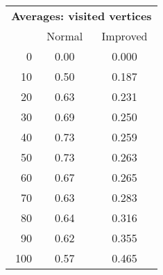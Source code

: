 \begin{tabular}{r|cc}
      \multicolumn{3}{c}{{\bf Averages: visited vertices }} \\
      & Normal & Improved \\ \hline\hline
0
& 0.00
& 0.000
\\
10
& 0.50
& 0.187
\\
20
& 0.63
& 0.231
\\
30
& 0.69
& 0.250
\\
40
& 0.73
& 0.259
\\
50
& 0.73
& 0.263
\\
60
& 0.67
& 0.265
\\
70
& 0.63
& 0.283
\\
80
& 0.64
& 0.316
\\
90
& 0.62
& 0.355
\\
100
& 0.57
& 0.465
\\
\end{tabular}
